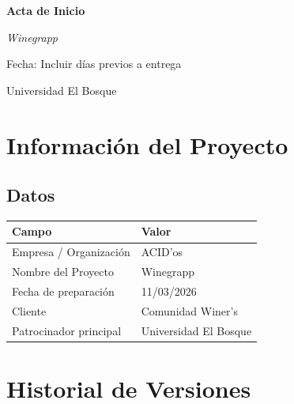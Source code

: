 \documentclass[12pt, a4paper]{article}
\begin{document}
\begin{titlepage}
    \centering
    \vspace*{2cm}
    {\Huge\bfseries Acta de Inicio\par}
    \vspace{1cm}
    {\LARGE\itshape Winegrapp\par}
    \vspace{2cm}
    {\large Fecha: Incluir días previos a entrega\par}
    \vfill
    {\large Universidad El Bosque\par}
\end{titlepage}

\tableofcontents
\newpage

\section{Información del Proyecto}

\subsection{Datos}

\begin{tabular}{@{} l l @{}}
    \toprule
    \textbf{Campo}              & \textbf{Valor} \\
    \midrule
    Empresa / Organización      & ACID'os \\
    Nombre del Proyecto         & Winegrapp \\
    Fecha de preparación        & 11/03/2026 \\
    Cliente                     & Comunidad Winer's \\
    Patrocinador principal      & Universidad El Bosque \\
    \bottomrule
\end{tabular}

\section{Historial de Versiones}
\end{document}
